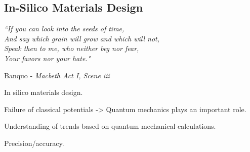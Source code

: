 \begin{refsection}

\chapter{In-Silico Materials Design}

\setlength{\epigraphwidth}{4in}
\epigraph{\textit{``If you can look into the seeds of time, \\And say which grain will grow and which will not,\\Speak then to me, who neither beg nor fear,\\Your favors nor your hate."}}{Banquo - \textit{Macbeth Act I, Scene iii}}
\vspace{3em}

In silico materials design.

Failure of classical potentials -> Quantum mechanics plays an important role.

Understanding of trends based on quantum mechanical calculations.

Precision/accuracy.

\printbibliography
\end{refsection}